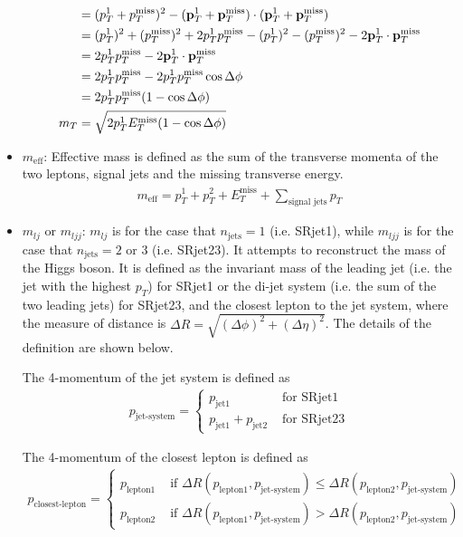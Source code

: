 \begin{itemize}
\begin{align}
&= (p_T^1 +  p_T^{\text{miss}})^2 - ({\bf p}_T^1 + {\bf p}_T^{\text{miss}}) \cdot ({\bf p}_T^1 + {\bf p}_T^{\text{miss}}) \\
&= (p_T^1)^2 + (p_T^{\text{miss}})^2 + 2 p_T^1 p_T^{\text{miss}}
 - (p_T^1)^2 - (p_T^{\text{miss}})^2 - 2 {\bf p}_T^1  \cdot {\bf p}_T^{\text{miss}} \\
&= 2 p_T^1 p_T^{\text{miss}} - 2 {\bf p}_T^1  \cdot {\bf p}_T^{\text{miss}} \\
&= 2 p_T^1 p_T^{\text{miss}} - 2 p_T^1 p_T^{\text{miss}} \cos{\Delta\phi} \\
&= 2 p_T^1 p_T^{\text{miss}} ( 1 - \cos{\Delta\phi} ) \\
m_T &= \sqrt{ 2 p_T^1 E_T^{\text{miss}} ( 1 - \cos{\Delta\phi} ) } \label{equ:mT_approx}
\end{align}
\item $m_{\text{eff}}$:
Effective mass is defined as the sum of the transverse momenta of the two leptons, signal jets and the missing transverse energy.
\begin{align}
m_{\text{eff}} = p_T^1 + p_T^2 + E_T^{\text{miss}} + \sum_{\text {signal jets}} p_T
\end{align}
\item $m_{lj}$ or $m_{ljj}$:
$m_{lj}$ is for the case that $n_{\text{jets}} = 1$ (i.e. SRjet1), while $m_{ljj}$ is for the case that $n_{\text{jets}} = 2$ or $3$ (i.e. SRjet23).
It attempts to reconstruct the mass of the Higgs boson.
It is defined as the invariant mass of the leading jet (i.e. the jet with the highest $p_T$) for SRjet1 or the di-jet system (i.e. the sum of the two leading jets) for SRjet23, and the closest lepton to the jet system, where the measure of distance is $\Delta R = \sqrt{(\Delta\phi)^2 + (\Delta\eta)^2}$.
The details of the definition are shown below.

The 4-momentum of the jet system is defined as
\begin{align}
p_{\text{jet-system}} =
\left\{
\begin{array}{ll}
p_{\text{jet1}} &\text{ for SRjet1}\\
p_{\text{jet1}} + p_{\text{jet2}} &\text{ for SRjet23}
\end{array} \right.
\end{align}

The 4-momentum of the closest lepton is defined as
\begin{align}
p_{\text{closest-lepton}} =
\left\{
\begin{array}{ll}
p_{\text{lepton1}} &\text{ if } \Delta R(p_{\text{lepton1}},p_{\text{jet-system}}) \leq \Delta R(p_{\text{lepton2}},p_{\text{jet-system}}) \\
p_{\text{lepton2}} &\text{ if } \Delta R(p_{\text{lepton1}},p_{\text{jet-system}}) > \Delta R(p_{\text{lepton2}},p_{\text{jet-system}})
\end{array} \right.
\end{align}


\end{itemize}

